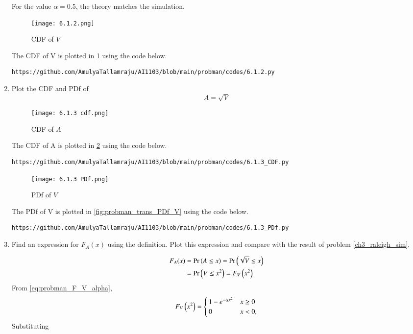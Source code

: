 \documentclass[journal,12pt,twocolumn]{IEEEtran}
\renewcommand\thesection{\arabic{section}}
\renewcommand\thesubsection{\thesection.\arabic{subsection}}
\begin{document}
\begin{enumerate}[label=\thesubsection.\arabic*.,ref=\thesubsection.\theenumi]
\solution
For the value $\alpha=0.5$, the theory matches the simulation.
\begin{figure}[!ht]
\centering
\texttt{[image: 6.1.2.png]}
\caption{CDF of $V$}
\label{fig:probman_F_V_alpha}
\end{figure}
The CDF of V is plotted in \ref{fig:probman_F_V_alpha} using the code below.
\begin{lstlisting}
https://github.com/AmulyaTallamraju/AI1103/blob/main/probman/codes/6.1.2.py
\end{lstlisting}
%
\item
\label{ch3_raleigh_sim}
Plot the CDF and PDf of
%
\begin{equation}
A = \sqrt{V}
\end{equation}
%
\begin{figure}[!ht]
\centering
\texttt{[image: 6.1.3 cdf.png]}
\caption{CDF of $A$}
\label{fig:probman_trans_cdf_A}
\end{figure}
The CDF of A is plotted in \ref{fig:probman_trans_cdf_A} using the code below.
\begin{lstlisting}
https://github.com/AmulyaTallamraju/AI1103/blob/main/probman/codes/6.1.3_CDF.py
\end{lstlisting}
\begin{figure}[!ht]
\centering
\texttt{[image: 6.1.3 PDf.png]}
\caption{PDf of $V$}
\label{fig:probman_trans_PDf_A}
\end{figure}
The PDf of V is plotted in \ref{fig:probman_trans_PDf_V} using the code below.
\begin{lstlisting}
https://github.com/AmulyaTallamraju/AI1103/blob/main/probman/codes/6.1.3_PDf.py
\end{lstlisting}
%
\item
Find an expression for $F_{A}(x)$ using the definition. Plot this expression and compare with the result of problem \ref{ch3_raleigh_sim}. 
\\
\solution 


\begin{align} 
F_A(x) &= \Pr\left(A \le x\right) = \Pr\left(\sqrt{V} \le x\right)
\\
&= \Pr\left(V \le x^2\right) = F_V\left(x^2\right)
\end{align}
%
From \eqref{eq:probman_F_V_alpha}, 
\begin{align} 
F_V\left(x^2\right) = 
\begin{cases}
1 - e^{-\alpha x^2} & x \geq 0 \\
0 & x < 0,
\end{cases}
\end{align}
%
Substituting 


\end{enumerate}
\end{document}
